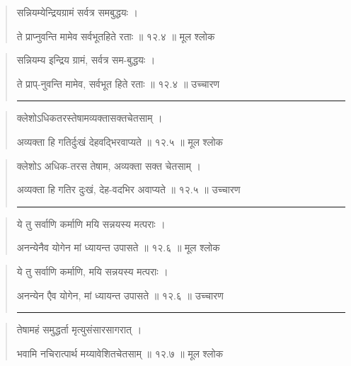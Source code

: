 \begin{quotation} 

सन्नियम्येन्द्रियग्रामं सर्वत्र समबुद्धयः  ।  

ते प्राप्नुवन्ति मामेव सर्वभूतहिते रताः  ॥ १२.४ ॥  मूल श्लोक
\end{quotation}

\begin{quotation}

सन्नियम्य इन्द्रिय ग्रामं, सर्वत्र सम-बुद्धयः  ।  

ते प्राप्-नुवन्ति मामेव, सर्वभूत हिते रताः  ॥ १२.४ ॥  उच्चारण

\noindent\rule{16cm}{0.4pt} 
\end{quotation}


\begin{quotation} 

क्लेशोऽधिकतरस्तेषामव्यक्तासक्तचेतसाम्‌  ।  

अव्यक्ता हि गतिर्दुःखं देहवद्भिरवाप्यते  ॥ १२.५ ॥  मूल श्लोक
\end{quotation}

\begin{quotation}

क्लेशोऽ अधिक-तरस तेषाम, अव्यक्ता सक्त चेतसाम्‌  ।  

अव्यक्ता हि गतिर दुःखं, देह-वदभिर अवाप्यते  ॥ १२.५ ॥  उच्चारण

\noindent\rule{16cm}{0.4pt} 
\end{quotation}


\begin{quotation} 

ये तु सर्वाणि कर्माणि मयि सन्नयस्य मत्पराः  ।  

अनन्येनैव योगेन मां ध्यायन्त उपासते  ॥ १२.६ ॥  मूल श्लोक
\end{quotation}

\begin{quotation}

ये तु सर्वाणि कर्माणि, मयि सन्नयस्य मत्पराः  ।  

अनन्येन एैव योगेन, मां ध्यायन्त उपासते  ॥ १२.६ ॥  उच्चारण

\noindent\rule{16cm}{0.4pt} 
\end{quotation}


\begin{quotation} 

तेषामहं समुद्धर्ता मृत्युसंसारसागरात्‌  ।  

भवामि नचिरात्पार्थ मय्यावेशितचेतसाम्‌  ॥ १२.७ ॥  मूल श्लोक
\end{quotation}

